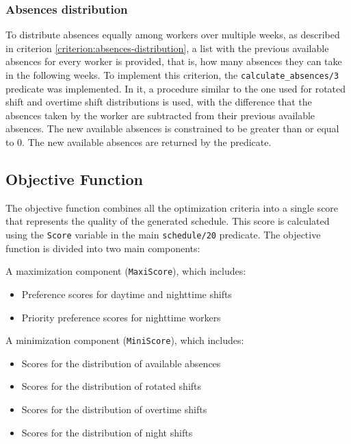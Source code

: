 \documentclass[conference]{IEEEtran}
\def\constraint#1{\vspace{4pt} {#1}}
\begin{document}
\constraint {
    \subsubsection*{Absences distribution}
    To distribute absences equally among workers over multiple weeks, as described in criterion \ref{criterion:absences-distribution}, a list with the previous available absences for every worker is provided, that is, how many absences they can take in the following weeks.
    To implement this criterion, the \texttt{calculate\_absences/3} predicate was implemented. In it, a procedure similar to the one used for rotated shift and overtime shift distributions is used, with the difference that the absences taken by the worker are subtracted from their previous available absences. The new available absences is constrained to be greater than or equal to 0. The new available absences are returned by the predicate.
}

\subsection{Objective Function}
\label{section:objective-function}

The objective function combines all the optimization criteria into a single score that represents the quality of the generated schedule. This score is calculated using the \texttt{Score} variable in the main \texttt{schedule/20} predicate.
The objective function is divided into two main components:

A maximization component (\texttt{MaxiScore}), which includes:

\begin{itemize}
    \item Preference scores for daytime and nighttime shifts
    \item Priority preference scores for nighttime workers
\end{itemize}

A minimization component (\texttt{MiniScore}), which includes:

\begin{itemize}
    \item Scores for the distribution of available absences
    \item Scores for the distribution of rotated shifts
    \item Scores for the distribution of overtime shifts
    \item Scores for the distribution of night shifts
\end{itemize}
\end{document}
